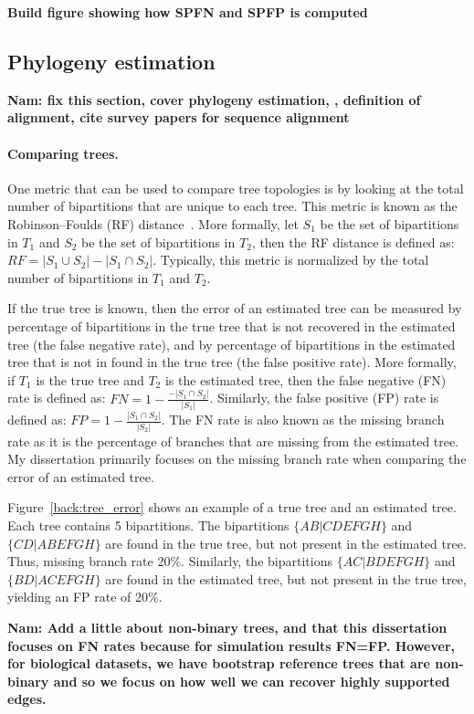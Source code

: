 \textbf{Build figure showing how SPFN and SPFP is computed}

\subsection{Phylogeny estimation}\label{back:alignment}
\textbf{Nam:  fix this section, cover phylogeny estimation, , definition of alignment, cite survey papers for sequence alignment}

\paragraph{Comparing trees.}  One metric that can be used to compare tree topologies is by looking at the total number of bipartitions that are unique to each tree.  This metric is known as the Robinson–Foulds (RF) distance~\cite{RF}.  More formally, let $S_1$ be the set of bipartitions in $T_1$ and $S_2$ be the set of bipartitions in $T_2$, then the RF distance is defined as: $RF=|S_1\cup S_2|-|S_1\cap S_2|$. Typically, this metric is normalized by the total number of bipartitions in $T_1$ and $T_2$.  

If the true tree is known, then the error of an estimated tree can be measured by percentage of bipartitions in the true tree that is not recovered in the estimated tree (the false negative rate), and by percentage of bipartitions in the estimated tree that is not in found in the true tree (the false positive rate).  More formally, if $T_1$ is the true tree and $T_2$ is the estimated tree, then the false negative (FN) rate is defined as: $FN=1-\frac{-|S_1\cap S_2|}{|S_1|}$.  Similarly, the false positive (FP) rate is defined as: $FP=1-\frac{|S_1\cap S_2|}{|S_2|}$.  The FN rate is also known as the missing branch rate as it is the percentage of branches that are missing from the estimated tree.  My dissertation primarily focuses on the missing branch rate when comparing the error of an estimated tree.

Figure~\ref{back:tree_error} shows an example of a true tree and an estimated tree.  Each tree contains 5 bipartitions.  The bipartitions $\{AB|CDEFGH\}$ and $\{CD|ABEFGH\}$ are found in the true tree, but not present in the estimated tree.  Thus, missing branch rate 20\%.  Similarly, the bipartitions $\{AC|BDEFGH\}$ and $\{BD|ACEFGH\}$ are found in the estimated tree, but not present in the true tree, yielding an FP rate of 20\%.

\textbf{Nam:  Add a little about non-binary trees, and that this dissertation focuses on FN rates because for simulation results FN=FP.  However, for biological datasets, we have bootstrap reference trees that are non-binary and so we focus on how well we can recover highly supported edges.  }


